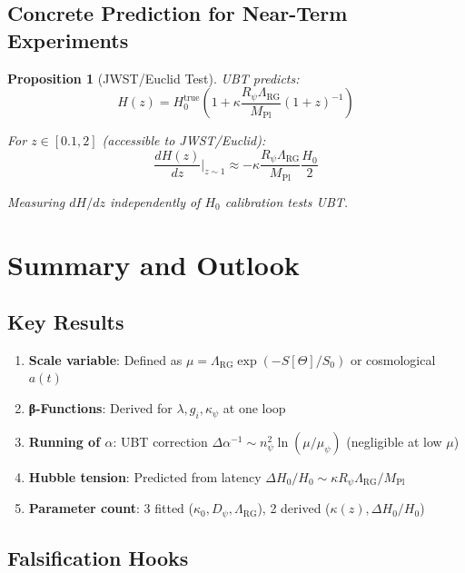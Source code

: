 \documentclass[12pt]{article}
\newtheorem{proposition}[definition]{Proposition}
\newcommand{\RG}{\text{RG}}
\begin{document}
\subsection{Concrete Prediction for Near-Term Experiments}

\begin{proposition}[JWST/Euclid Test]
\label{prop:jwst_test}
UBT predicts:
\begin{equation}
H(z) = H_0^{\text{true}} \left(1 + \kappa \frac{R_\psi \Lambda_{\RG}}{M_{\text{Pl}}} (1+z)^{-1}\right)
\end{equation}

For $z \in [0.1, 2]$ (accessible to JWST/Euclid):
\begin{equation}
\frac{dH(z)}{dz} \bigg|_{z \sim 1} \approx -\kappa \frac{R_\psi \Lambda_{\RG}}{M_{\text{Pl}}} \frac{H_0}{2}
\end{equation}

Measuring $dH/dz$ independently of $H_0$ calibration tests UBT.
\end{proposition}

\section{Summary and Outlook}

\subsection{Key Results}

\begin{enumerate}
    \item \textbf{Scale variable}: Defined as $\mu = \Lambda_{\RG} \exp(-S[\Theta]/S_0)$ or cosmological $a(t)$
    \item \textbf{β-Functions}: Derived for $\lambda, g_i, \kappa_\psi$ at one loop
    \item \textbf{Running of $\alpha$}: UBT correction $\Delta \alpha^{-1} \sim n_\psi^2 \ln(\mu/\mu_\psi)$ (negligible at low $\mu$)
    \item \textbf{Hubble tension}: Predicted from latency $\Delta H_0/H_0 \sim \kappa R_\psi \Lambda_{\RG} / M_{\text{Pl}}$
    \item \textbf{Parameter count}: 3 fitted ($\kappa_0, D_\psi, \Lambda_{\RG}$), 2 derived ($\kappa(z), \Delta H_0/H_0$)
\end{enumerate}

\subsection{Falsification Hooks}
\end{document}
